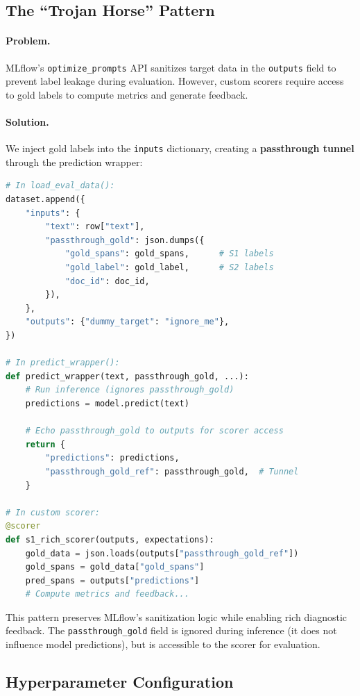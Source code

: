 \documentclass[11pt]{article}
\begin{document}
\subsection{The ``Trojan Horse'' Pattern}

\paragraph{Problem.} MLflow's \texttt{optimize\_prompts} API sanitizes target data in the
\texttt{outputs} field to prevent label leakage during evaluation. However,
custom scorers require access to gold labels to compute metrics and generate
feedback.

\paragraph{Solution.} We inject gold labels into the \texttt{inputs} dictionary, creating a
\textbf{passthrough tunnel} through the prediction wrapper:

\begin{lstlisting}[language=Python, caption=Trojan Horse Implementation]
# In load_eval_data():
dataset.append({
    "inputs": {
        "text": row["text"],
        "passthrough_gold": json.dumps({
            "gold_spans": gold_spans,      # S1 labels
            "gold_label": gold_label,      # S2 labels
            "doc_id": doc_id,
        }),
    },
    "outputs": {"dummy_target": "ignore_me"},
})

# In predict_wrapper():
def predict_wrapper(text, passthrough_gold, ...):
    # Run inference (ignores passthrough_gold)
    predictions = model.predict(text)
    
    # Echo passthrough_gold to outputs for scorer access
    return {
        "predictions": predictions,
        "passthrough_gold_ref": passthrough_gold,  # Tunnel
    }

# In custom scorer:
@scorer
def s1_rich_scorer(outputs, expectations):
    gold_data = json.loads(outputs["passthrough_gold_ref"])
    gold_spans = gold_data["gold_spans"]
    pred_spans = outputs["predictions"]
    # Compute metrics and feedback...
\end{lstlisting}

This pattern preserves MLflow's sanitization logic while enabling rich
diagnostic feedback. The \texttt{passthrough\_gold} field is ignored during
inference (it does not influence model predictions), but is accessible to the
scorer for evaluation.

\subsection{Hyperparameter Configuration}
\end{document}
